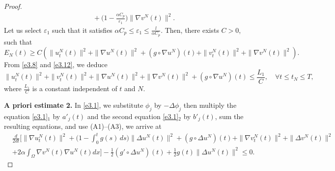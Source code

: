 \documentclass[10pt,a4paper]{amsart}
\numberwithin{equation}{section}
\begin{document}
\begin{proof}
\begin{equation}
\begin{aligned}
 &\quad +\Big( 1-\frac{\alpha C_p}{\varepsilon_{1}}\Big) \| \nabla v^N(t) \|^2.
\end{aligned}\label{e3.13}
\end{equation}
Let us select $\varepsilon_{1}$ such that it satisfies
$\alpha C_p \leq \varepsilon_{1}\leq \frac{l}{\alpha C_p}$.
Then, there exists $C>0$, such that
\begin{equation}
E_N(t)\geq C\left( \| u^N_{t}(t) \|^2 + \| \nabla u^N (t)\|^2
+(g\circ\nabla u^N)(t)+\| v^N_{t}(t) \|^2 + \| \nabla v^N (t)\|^2\right).\label{e3.14}
\end{equation}
From \eqref{e3.8} and \eqref{e3.12}, we deduce
\begin{equation}
\| u^N_{t}(t) \|^2 +\| v^N_{t}(t) \|^2 + \| \nabla u^N(t) \|^2
+ \| \nabla v^N (t)\|^2 +(g\circ\nabla u^N)(t)\leq \frac{L_{1}}{C},\quad
\forall t\leq t_{N}\leq T,
\label{e3.15}
\end{equation}
where $\frac{L_{1}}{C}$ is a constant independent of $t$ and $N$.
\smallskip

\noindent\textbf{A priori estimate 2.}
In \eqref{e3.1}, we substitute $\phi_j $ by $ -\Delta \phi_j$ then
multiply the equation \eqref{e3.1}$_1$ by $a'_j(t)$ and the second equation
\eqref{e3.1}$_2$ by $b'_j(t)$, sum the resulting equations, and use
(A1)--(A3), we arrive at
\begin{align*}
&\frac{d}{2dt}\Big[ \| \nabla u^N_{t}(t) \|^2
+\Big( 1 - \int_0^t g(s)\,ds \Big) \| \Delta u^N(t) \|^2
+ (g \circ \Delta u^N)(t) + \| \nabla v^N_{t}(t) \|^2
+ \| \Delta v^N(t) \|^2 \\
& +2 \alpha \int_{\Omega} \nabla v^N(t) \nabla u^N(t) dx\Big]
-\frac{1}{2} \left( g' \circ \Delta u^N \right)(t)
+\frac{1}{2} g(t) \| \Delta u^N(t) \|^2\leq 0.
\end{align*}


\end{proof}
\end{document}
